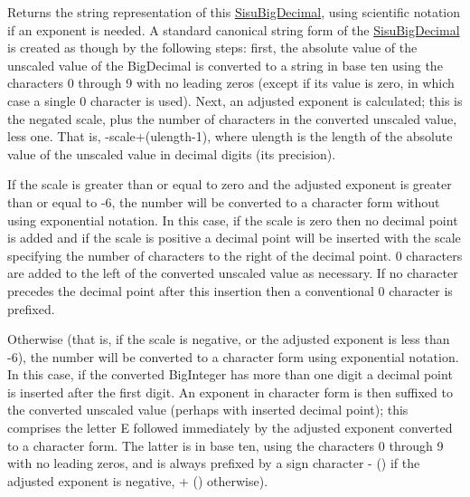 Returns the string representation of this \hyperlink{classcom_1_1aarrelaakso_1_1drawl_1_1_sisu_big_decimal}{Sisu\+Big\+Decimal}, using scientific notation if an exponent is needed. A standard canonical string form of the \hyperlink{classcom_1_1aarrelaakso_1_1drawl_1_1_sisu_big_decimal}{Sisu\+Big\+Decimal} is created as though by the following steps\+: first, the absolute value of the unscaled value of the Big\+Decimal is converted to a string in base ten using the characters \textquotesingle{}0\textquotesingle{} through \textquotesingle{}9\textquotesingle{} with no leading zeros (except if its value is zero, in which case a single \textquotesingle{}0\textquotesingle{} character is used). Next, an adjusted exponent is calculated; this is the negated scale, plus the number of characters in the converted unscaled value, less one. That is, -\/scale+(ulength-\/1), where ulength is the length of the absolute value of the unscaled value in decimal digits (its precision). 

If the scale is greater than or equal to zero and the adjusted exponent is greater than or equal to -\/6, the number will be converted to a character form without using exponential notation. In this case, if the scale is zero then no decimal point is added and if the scale is positive a decimal point will be inserted with the scale specifying the number of characters to the right of the decimal point. \textquotesingle{}0\textquotesingle{} characters are added to the left of the converted unscaled value as necessary. If no character precedes the decimal point after this insertion then a conventional \textquotesingle{}0\textquotesingle{} character is prefixed. 

Otherwise (that is, if the scale is negative, or the adjusted exponent is less than -\/6), the number will be converted to a character form using exponential notation. In this case, if the converted Big\+Integer has more than one digit a decimal point is inserted after the first digit. An exponent in character form is then suffixed to the converted unscaled value (perhaps with inserted decimal point); this comprises the letter \textquotesingle{}E\textquotesingle{} followed immediately by the adjusted exponent converted to a character form. The latter is in base ten, using the characters \textquotesingle{}0\textquotesingle{} through \textquotesingle{}9\textquotesingle{} with no leading zeros, and is always prefixed by a sign character \textquotesingle{}-\/\textquotesingle{} (\textquotesingle{}\textquotesingle{}) if the adjusted exponent is negative, \textquotesingle{}+\textquotesingle{} (\textquotesingle{}\textquotesingle{}) otherwise). 

